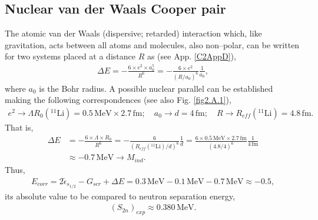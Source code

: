  \begin{subappendices}
 \section{Nuclear van der Waals Cooper pair}\label{C2SG2}
 The atomic van der Waals (dispersive; retarded) interaction which, like gravitation,  acts between all atoms and molecules, also non--polar, can be written for two systems placed at a distance $R$ as (see App. \ref{C2AppD}), 
 \begin{align}\label{eq1C2AppG}
 \Delta E=-\frac{6\times e^2 \times a_0^5}{R^6}=-\frac{6\times e^2}{(R/a_0)^6}\frac{1}{a_0},
 \end{align}
 where $a_0$ is the Bohr radius. A possible nuclear parallel can be established making the following correspondences (see also Fig. \ref{fig2.A.1}),
 \begin{align*}
e^2\rightarrow \Lambda R_0 (^{11}\text{Li})=0.5\, \text{MeV}\times 2.7 \,\text{fm};\quad a_0\rightarrow d=4\,\text{fm};\quad R\rightarrow R_{eff} (^{11}\text{Li})=4.8\,\text{fm}.
 \end{align*} 
 That is,
  \begin{align*}
  \Delta E&=-\frac{6\times \Lambda\times R_0}{R^6}=-\frac{6}{(R_{eff} (^{11}\text{Li})/d)^6}\frac{1}{d}=\frac{6\times 0.5\,\text{MeV}\times 2.7 \,\text{fm}}{(4.8/4)^6}\frac{1}{4\,\text{fm}}\\
&  \approx -0.7\,\text{MeV}\rightarrow M_{ind}.
  \end{align*}
  Thus,
 \begin{align*}
E_{corr}=2\tilde{\epsilon}_{s_{1/2}}-G_{scr}+\Delta E=0.3\,\text{MeV}-0.1\,\text{MeV}-0.7\,\text{MeV}\approx -0.5,
 \end{align*} 
 its absolute value 
to be compared to neutron separation energy, 
 \begin{align*}
(S_{2n})_{exp}\approx 0.380 \,\text{MeV}.
 \end{align*} 



\end{subappendices}
